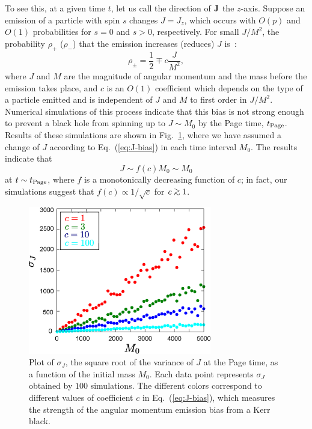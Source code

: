 \documentclass[12pt]{article}
\begin{document}
To see this, at a given time $t$, let us call the direction of ${\bf J}$ 
the $z$-axis.  Suppose an emission of a particle with spin $s$ changes 
$J = J_z$, which occurs with $O(p)$ and $O(1)$ probabilities for $s = 0$ 
and $s > 0$, respectively.  For small $J/M^2$, the probability $\rho_+$ 
($\rho_{-}$) that the emission increases (reduces) $J$ is~\cite{Page:1976df}:
%
\begin{equation}
  \rho_{\pm} = \frac{1}{2} \mp c \frac{J}{M^2},
\label{eq:J-bias}
\end{equation}
%
where $J$ and $M$ are the magnitude of angular momentum and the mass 
before the emission takes place, and $c$ is an $O(1)$ coefficient 
which depends on the type of a particle emitted and is independent of 
$J$ and $M$ to first order in $J/M^2$. Numerical simulations of this 
process indicate that this bias is not strong enough to prevent a black 
hole from spinning up to $J \sim M_0$ by the Page time, $t_{\rm Page}$. 
Results of these simulations are shown in Fig.~\ref{fig:angdat}, where 
we have assumed a change of $J$ according to Eq.~(\ref{eq:J-bias}) in 
each time interval $M_0$.  The results indicate that
%
\begin{equation}
  J \sim f(c) M_0 \sim M_0
\label{eq:final-J}
\end{equation}
%
at $t \sim t_{\rm Page}$, where $f$ is a monotonically decreasing function 
of $c$; in fact, our simulations suggest that $f(c) \propto 1/\sqrt{c}$ 
for $c \simgt 1$.
%
\begin{figure}[t]
\begin{center}
  \includegraphics[width=8cm]{figure/angular.eps}
\caption{Plot of $\sigma_J$, the square root of the variance of $J$ at 
 the Page time, as a function of the initial mass $M_0$.  Each data point 
 represents $\sigma_J$ obtained by $100$ simulations.  The different colors 
 correspond to different values of coefficient $c$ in Eq.~(\ref{eq:J-bias}), 
 which measures the strength of the angular momentum emission bias from 
 a Kerr black.}
\label{fig:angdat}
\end{center}
\end{figure}
%
\end{document}
